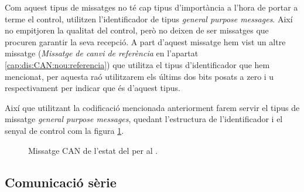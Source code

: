 Com aquest tipus de missatges no té cap tipus d'importància a l'hora de portar a terme el control, utilitzen l'identificador de tipus \emph{general purpose messages}. Així no empitjoren la qualitat del control, però no deixen de ser missatges que procuren garantir la seva recepció. A part d'aquest missatge hem vist un altre missatge (\emph{Missatge de canvi de referència} en l'apartat \ref{cap:dis:CAN:nou:referencia}) que utilitza el tipus d'identificador que hem mencionat, per aquesta raó utilitzarem els últims dos bits posats a zero i u respectivament per indicar que és d'aquest tipus.

Així que utilitzant la codificació mencionada anteriorment farem servir el tipus de missatge \emph{general purpose messages}, quedant l'estructura de l'identificador i el senyal de control com la figura \ref{fig:bit_encoding:CAN:nou:SetoSu}.

\begin{figure}[ht!]
	
    \caption{Missatge CAN de l'estat del \Sensor per al \Supervisor.}
    \label{fig:bit_encoding:CAN:nou:SetoSu}
\end{figure}

\subsection{Comunicació sèrie}\label{cap:dis:comSer}

